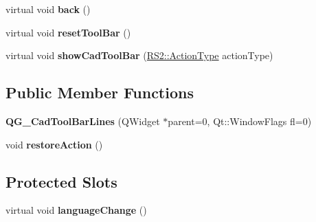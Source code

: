 \begin{DoxyCompactItemize}
\item 
\hypertarget{classQG__CadToolBarLines_a0015c9925152fc9abe3a227803bebd2e}{virtual void {\bfseries back} ()}\label{classQG__CadToolBarLines_a0015c9925152fc9abe3a227803bebd2e}

\item 
\hypertarget{classQG__CadToolBarLines_aa7e308f9859d79a1cf9d8b46f3aac1da}{virtual void {\bfseries reset\-Tool\-Bar} ()}\label{classQG__CadToolBarLines_aa7e308f9859d79a1cf9d8b46f3aac1da}

\item 
\hypertarget{classQG__CadToolBarLines_a2be0794281be84f10b6acc2b82bfe718}{virtual void {\bfseries show\-Cad\-Tool\-Bar} (\hyperlink{classRS2_afe3523e0bc41fd637b892321cfc4b9d7}{R\-S2\-::\-Action\-Type} action\-Type)}\label{classQG__CadToolBarLines_a2be0794281be84f10b6acc2b82bfe718}

\end{DoxyCompactItemize}
\subsection*{Public Member Functions}
\begin{DoxyCompactItemize}
\item 
\hypertarget{classQG__CadToolBarLines_ac6af61c4e49c06b401a34a3f5b437357}{{\bfseries Q\-G\-\_\-\-Cad\-Tool\-Bar\-Lines} (Q\-Widget $\ast$parent=0, Qt\-::\-Window\-Flags fl=0)}\label{classQG__CadToolBarLines_ac6af61c4e49c06b401a34a3f5b437357}

\item 
\hypertarget{classQG__CadToolBarLines_afeabcaef64e7a9d8af555725993f6746}{void {\bfseries restore\-Action} ()}\label{classQG__CadToolBarLines_afeabcaef64e7a9d8af555725993f6746}

\end{DoxyCompactItemize}
\subsection*{Protected Slots}
\begin{DoxyCompactItemize}
\item 
\hypertarget{classQG__CadToolBarLines_ac7bcce9d963de1553df07fda56d012ac}{virtual void {\bfseries language\-Change} ()}\label{classQG__CadToolBarLines_ac7bcce9d963de1553df07fda56d012ac}

\end{DoxyCompactItemize}
